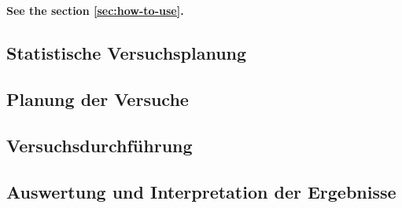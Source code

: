\chapter{}
\label{sec:Versuche}

\textbf{See the section \ref{sec:how-to-use}.}

\section{Statistische Versuchsplanung}

\section{Planung der Versuche}

\section{Versuchsdurchführung}

\section{Auswertung und Interpretation der Ergebnisse}

